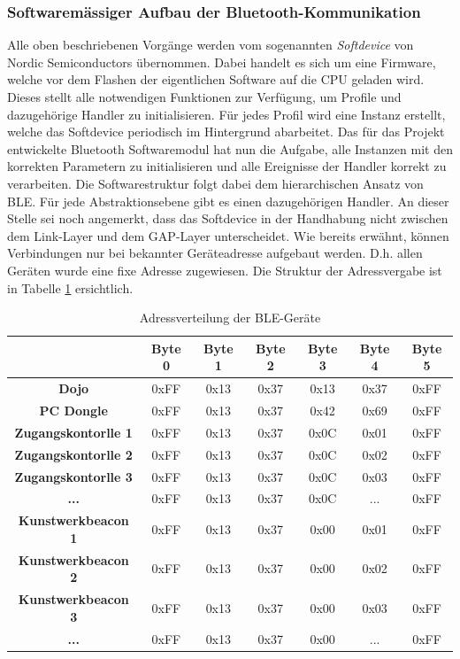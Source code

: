 \subsubsection{Softwaremässiger Aufbau der Bluetooth-Kommunikation}
Alle oben beschriebenen Vorgänge werden vom sogenannten \textit{Softdevice} von Nordic Semiconductors übernommen. Dabei handelt es sich um eine Firmware, welche vor dem Flashen der eigentlichen Software auf die CPU geladen wird. Dieses stellt alle notwendigen Funktionen zur Verfügung, um Profile und dazugehörige Handler zu initialisieren. Für jedes Profil wird eine Instanz erstellt, welche das Softdevice periodisch im Hintergrund abarbeitet. 
Das für das Projekt entwickelte Bluetooth Softwaremodul hat nun die Aufgabe, alle Instanzen mit den korrekten Parametern zu initialisieren und alle Ereignisse der Handler korrekt zu verarbeiten. Die Softwarestruktur folgt dabei dem hierarchischen Ansatz von BLE. Für jede Abstraktionsebene gibt es einen dazugehörigen Handler. An dieser Stelle sei noch angemerkt, dass das Softdevice in der Handhabung nicht zwischen dem Link-Layer und dem GAP-Layer unterscheidet.
Wie bereits erwähnt, können Verbindungen nur bei bekannter Geräteadresse aufgebaut werden. D.h. allen Geräten wurde eine fixe Adresse zugewiesen. Die Struktur der Adressvergabe ist in Tabelle \ref{tab:BLE_Adresse} ersichtlich.
\begin{table}[h]
  \centering
  \begin{tabular}{|c|c|c|c|c|c|c|}
    \hline
      & \textbf{Byte 0} & \textbf{Byte 1} & \textbf{Byte 2} & \textbf{Byte 3} & \textbf{Byte 4} & \textbf{Byte 5}\\
    \hline
    \textbf{Dojo} 			& 0xFF & 0x13 & 0x37 & 0x13 & 0x37 & 0xFF \\
    \hline
    \textbf{PC Dongle} 			& 0xFF & 0x13 & 0x37 & 0x42 & 0x69 & 0xFF \\
    \hline
    \textbf{Zugangskontorlle 1} 	& 0xFF & 0x13 & 0x37 & 0x0C & 0x01 & 0xFF \\
    \hline
    \textbf{Zugangskontorlle 2} 	& 0xFF & 0x13 & 0x37 & 0x0C & 0x02 & 0xFF \\
    \hline
    \textbf{Zugangskontorlle 3} 	& 0xFF & 0x13 & 0x37 & 0x0C & 0x03 & 0xFF \\
    \hline
    \textbf{ ... } 			& 0xFF & 0x13 & 0x37 & 0x0C & ...  & 0xFF \\
    \hline
    \textbf{Kunstwerkbeacon 1} 		& 0xFF & 0x13 & 0x37 & 0x00 & 0x01 & 0xFF \\
    \hline
    \textbf{Kunstwerkbeacon 2} 		& 0xFF & 0x13 & 0x37 & 0x00 & 0x02 & 0xFF \\
    \hline
    \textbf{Kunstwerkbeacon 3} 		& 0xFF & 0x13 & 0x37 & 0x00 & 0x03 & 0xFF \\
    \hline
    \textbf{ ... } 			& 0xFF & 0x13 & 0x37 & 0x00 & ...  & 0xFF \\
    \hline
  \end{tabular}
  \caption{Adressverteilung der BLE-Geräte}\label{tab:BLE_Adresse}
\end{table}
\vspace{1cm}
